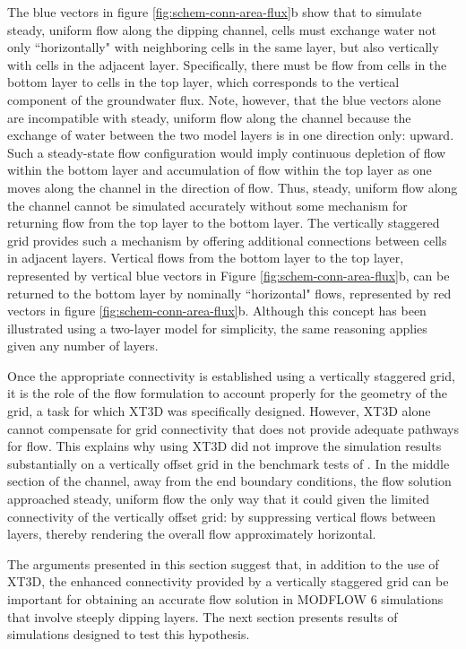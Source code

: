 \documentclass{article}
\begin{document}
The blue vectors in figure \ref{fig:schem-conn-area-flux}b show that to simulate steady, uniform flow along the dipping channel, cells must exchange water not only ``horizontally" with neighboring cells in the same layer, but also vertically with cells in the adjacent layer. Specifically, there must be flow from cells in the bottom layer to cells in the top layer, which corresponds to the vertical component of the groundwater flux. Note, however, that the blue vectors alone are incompatible with steady, uniform flow along the channel because the exchange of water between the two model layers is in one direction only: upward. Such a steady-state flow configuration would imply continuous depletion of flow within the bottom layer and accumulation of flow within the top layer as one moves along the channel in the direction of flow. Thus, steady, uniform flow along the channel cannot be simulated accurately without some mechanism for returning flow from the top layer to the bottom layer. The vertically staggered grid provides such a mechanism by offering additional connections between cells in adjacent layers. Vertical flows from the bottom layer to the top layer, represented by vertical blue vectors in Figure \ref{fig:schem-conn-area-flux}b, can be returned to the bottom layer by nominally ``horizontal" flows, represented by red vectors in figure \ref{fig:schem-conn-area-flux}b. Although this concept has been illustrated using a two-layer model for simplicity, the same reasoning applies given any number of layers.

Once the appropriate connectivity is established using a vertically staggered grid, it is the role of the flow formulation to account properly for the geometry of the grid, a task for which XT3D was specifically designed. However, XT3D alone cannot compensate for grid connectivity that does not provide adequate pathways for flow. This explains why using XT3D did not improve the simulation results substantially on a vertically offset grid in the benchmark tests of \cite{bardot2022}.  In the middle section of the channel, away from the end boundary conditions, the flow solution approached steady, uniform flow the only way that it could given the limited connectivity of the vertically offset grid: by suppressing vertical flows between layers, thereby rendering the overall flow approximately horizontal.

The arguments presented in this section suggest that, in addition to the use of XT3D, the enhanced connectivity provided by a vertically staggered grid can be important for obtaining an accurate flow solution in MODFLOW 6 simulations that involve steeply dipping layers. The next section presents results of simulations designed to test this hypothesis.
\end{document}
